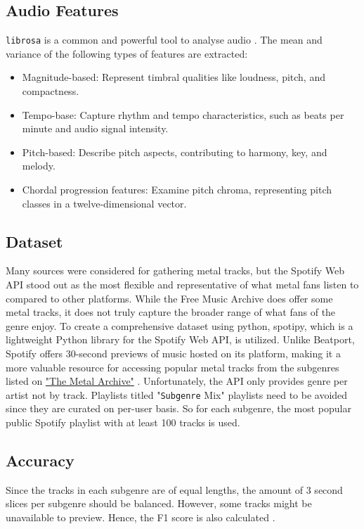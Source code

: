 \subsection{Audio Features}
\verb|librosa| is a common and powerful tool to analyse audio \cite{mcfee2015librosa}. The mean and variance of the following types of features are extracted:
\begin{itemize}
    \item Magnitude-based: Represent timbral qualities like loudness, pitch, and compactness.
    \item Tempo-base: Capture rhythm and tempo characteristics, such as beats per minute and audio signal intensity.
    \item Pitch-based: Describe pitch aspects, contributing to harmony, key, and melody.
    \item Chordal progression features: Examine pitch chroma, representing pitch classes in a twelve-dimensional vector.
\end{itemize}

\subsection{Dataset}
Many sources were considered for gathering metal tracks, but the Spotify Web API stood out as the most flexible and representative of what metal fans listen to compared to other platforms. While the Free Music Archive does offer some metal tracks, it does not truly capture the broader range of what fans of the genre enjoy. To create a comprehensive dataset using python, spotipy, which is a lightweight Python library for the Spotify Web API, is utilized. Unlike Beatport, Spotify offers 30-second previews of music hosted on its platform, making it a more valuable resource for accessing popular metal tracks from the subgenres listed on \href{https://www.metal-archives.com/}{"The Metal Archive"} \cite{archer2021metaldata}. Unfortunately, the API only provides genre per artist not by track. Playlists titled "{\verb|Subgenre|} Mix" playlists need to be avoided since they are curated on per-user basis. So for each subgenre, the most popular public Spotify playlist with at least 100 tracks is used.

\subsection{Accuracy}
Since the tracks in each subgenre are of equal lengths, the amount of 3 second slices per subgenre should be balanced. However, some tracks might be unavailable to preview. Hence, the F1 score is also calculated \cite{jeni2013facing}.
